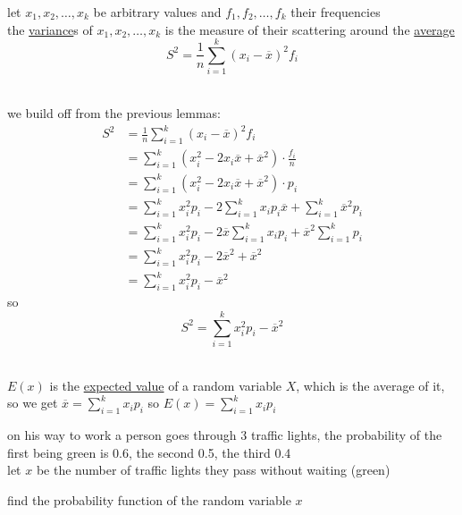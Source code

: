\documentclass[11pt]{article}
\begin{document}
\begin{definition}
\begin{lemma}
let \(x_1,x_2,\dots,x_k\) be arbitrary values and \(f_1,f_2,\dots,f_k\) their frequencies\\[0pt]
the \href{20230113164748-variance.org}{variance}s of \(x_1,x_2,\dots,x_k\) is the measure of their scattering around the \href{20220813152209-average.org}{average}\\[0pt]
\[
S^2 = \frac{1}{n} \sum_{i=1}^{k} (x_i-\overline{x})^2 f_i
\]\\[0pt]
\end{lemma}
\begin{lemma}
we build off from the previous lemmas:\\[0pt]
\begin{align*}
S^2 &= \frac{1}{n} \sum_{i=1}^{k} (x_i-\overline{x})^2 f_i\\
&= \sum_{i=1}^{k} (x_i^2-2x_i\overline{x}+\overline{x}^2) \cdot \frac{f_i}{n}\\
&= \sum_{i=1}^{k} (x_i^2-2x_i\overline{x}+\overline{x}^2) \cdot p_i\\
&= \sum_{i=1}^{k} x_i^2p_i - 2\sum_{i=1}^{k} x_ip_i\overline{x} + \sum_{i=1}^{k} \overline{x}^2p_i\\
&= \sum_{i=1}^{k} x_i^2p_i - 2\overline{x}\sum_{i=1}^{k} x_ip_i + \overline{x}^2\sum_{i=1}^{k} p_i\\
&= \sum_{i=1}^{k} x_i^2p_i - 2\overline{x}^2 + \overline{x}^2\\
&= \sum_{i=1}^{k} x_i^2p_i - \overline{x}^2
\end{align*}
so\\[0pt]
\[
S^2 = \sum_{i=1}^{k} x_i^2p_i - \overline{x}^2
\]\\[0pt]
\end{lemma}
\begin{lemma}
\(E(x)\) is the \href{20230121184721-expected_value.org}{expected value} of a random variable \(X\), which is the average of it, so we get \(\overline{x} = \sum_{i=1}^{k} x_ip_i\) so \(E(x) = \sum_{i=1}^{k} x_ip_i\)\\[0pt]
\end{lemma}
\begin{my_example}
on his way to work a person goes through 3 traffic lights, the probability of the first being green is 0.6, the second 0.5, the third 0.4\\[0pt]
let \(x\) be the number of traffic lights they pass without waiting (green)\\[0pt]
\begin{subquestion}
find the probability function of the random variable \(x\)\\[0pt]

\end{subquestion}
\end{my_example}
\end{definition}
\end{document}
